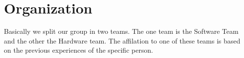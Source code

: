 \chapter{Organization}
Basically we split our group in two teams. The one team is the Software Team and the other the Hardware team. The affilation to one of these teams is based on the previous experiences of the specific person.